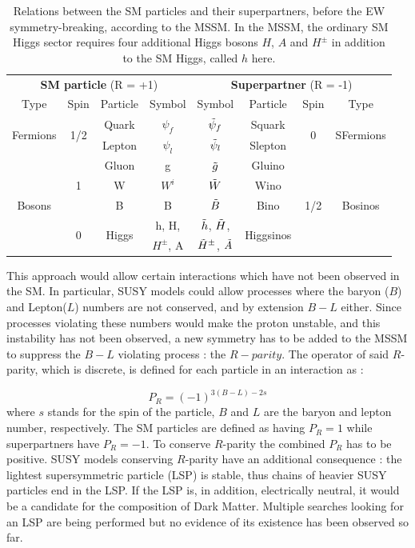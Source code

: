 \begin{table}[]
    \centering
    \caption{Relations between the SM particles and their superpartners, before the EW symmetry-breaking, according to the MSSM. In the MSSM, the ordinary SM Higgs sector requires four additional Higgs bosons $H$, $A$ and $H^{\pm}$ in addition to the SM Higgs, called $h$ here.}
    \begin{tabular}{c c c c | c c c c}
         \multicolumn{4}{c}{\textbf{SM particle} (R = +1)} & \multicolumn{4}{c}{\textbf{Superpartner} (R = -1)} \\
        Type & Spin & Particle & Symbol & Symbol & Particle & Spin & Type \\
        \hline
        \multirow{2}{*}{Fermions} & \multirow{2}{*}{1/2} & Quark & $\psi_f$ & $\Tilde{\psi}_f$ & Squark & \multirow{2}{*}{0} & \multirow{2}{*}{SFermions} \\
         & & Lepton & $\psi_l$ & $\Tilde{\psi}_l$ & Slepton & & \\
         \hline
         \multirow{5}{*}{Bosons} & \multirow{3}{*}{1} & Gluon & g & $\Tilde{g}$
   & Gluino & \multirow{5}{*}{1/2} & \multirow{5}{*}{Bosinos} \\
          & & W & $W^i$ & $\Tilde{W}$ & Wino & & \\
          & & B & B & $\Tilde{B}$ & Bino & & \\
          & \multirow{2}{*}{0} & \multirow{2}{*}{Higgs} & h, H, & $\Tilde{h}$, $\Tilde{H}$, & \multirow{2}{*}{Higgsinos} & & \\
          & & & $H^{\pm}$, A & $\Tilde{H}^{\pm}$, $\Tilde{A}$ & & & \\ 
          \hline
    \end{tabular}
    \label{tab:superpartners}
\end{table}

This approach would allow certain interactions which have not been observed in the SM. In particular, SUSY models could allow processes where the baryon ($B$) and Lepton($L$) numbers are not conserved, and by extension $B - L$ either. Since processes violating these numbers would make the proton unstable, and this instability has not been observed, a new symmetry has to be added to the MSSM to suppress the $B-L$ violating process : the $R-parity$. The operator of said $R$-parity, which is discrete, is defined for each particle in an interaction as :

\begin{equation}
    P_R = (-1)^{3(B-L)-2s}
\end{equation}
where $s$ stands for the spin of the particle, $B$ and $L$ are the baryon and lepton number, respectively. The SM particles are defined as having $P_R = 1$ while superpartners have $P_R = -1$. To conserve $R$-parity the combined $P_R$ has to be positive. SUSY models conserving $R$-parity have an additional consequence : the lightest supersymmetric particle (LSP) is stable, thus chains of heavier SUSY particles end in the LSP. If the LSP is, in addition, electrically neutral, it would be a candidate for the composition of Dark Matter. Multiple searches looking for an LSP are being performed but no evidence of its existence has been observed so far.\newline

